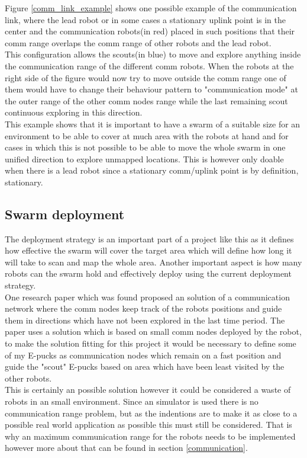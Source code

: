 Figure \ref{comm_link_example} shows one possible example of the communication link, where the lead robot or in some cases a stationary uplink point is in the center and the communication robots(in red) placed in such positions that their comm range overlaps the comm range of other robots and the lead robot. \\
This configuration allows the scouts(in blue) to move and explore anything inside the communication range of the different comm robots. When the robots at the right side of the figure would now try to move outside the comm range one of them would have to change their behaviour pattern to "communication mode" at the outer range of the other comm nodes range while the last remaining scout continuous exploring in this direction. \\
This example shows that it is important to have a swarm of a suitable size for an environment to be able to cover at much area with the robots at hand and for cases in which this is not possible to be able to move the whole swarm in one unified direction to explore unmapped locations. This is however only doable when there is a lead robot since a stationary comm/uplink point is by definition, stationary.\\

\subsection{Swarm deployment}
The deployment strategy is an important part of a  project like this  as it defines how effective the swarm will cover the target area which will define how long it will take to scan and map the whole area. Another important aspect is how many robots can the swarm hold and effectively deploy using the current deployment strategy. \\ 
One research paper which was found proposed an solution of a communication network where the comm nodes keep track of the robots positions and guide them in directions which have not been explored in the last time period\cite{Batalin2003Coverage}. The paper uses a solution which is based on small comm nodes deployed by the robot, to make the solution fitting for this project it would be necessary to define some of my E-pucks as communication nodes which remain on a fast position and guide the "scout" E-pucks based on area which have been least visited by the other robots.\\ 
This is certainly an possible solution however it could be considered a waste of robots in an small environment. Since an simulator is used there is no communication range problem, but as the indentions are to make it as close to a possible real world application as possible this must still be considered. 
That is why an maximum communication range for the robots needs to be implemented however more about that can be found in section \ref{communication}.\\[3ex]

